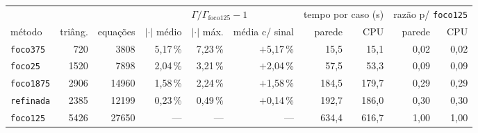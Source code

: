 \begin{tabular}{@{}lrrrrrrrrr@{}}
\toprule
 & & & \multicolumn{3}{c}{$\Gamma/\Gamma_{\mathrm{foco125}}-1$} & \multicolumn{2}{c}{tempo por caso (s)} & \multicolumn{2}{c}{razão p/ \texttt{foco125}} \\
\cmidrule(lr){4-6}\cmidrule(lr){7-8}\cmidrule(l){9-10}
método & triâng. & equações & $|\cdot|$ médio & $|\cdot|$ máx. & média c/ sinal & parede & CPU & parede & CPU \\
\midrule
\texttt{foco375} & 720 & 3808 & 5{,}17\,\% & 7{,}23\,\% & $+$5{,}17\,\% & 15{,}5 & 15{,}1 & 0{,}02 & 0{,}02 \\
\texttt{foco25} & 1520 & 7898 & 2{,}04\,\% & 3{,}21\,\% & $+$2{,}04\,\% & 57{,}5 & 53{,}3 & 0{,}09 & 0{,}09 \\
\texttt{foco1875} & 2906 & 14960 & 1{,}58\,\% & 2{,}24\,\% & $+$1{,}58\,\% & 184{,}5 & 179{,}7 & 0{,}29 & 0{,}29 \\
\texttt{refinada} & 2385 & 12199 & 0{,}23\,\% & 0{,}49\,\% & $+$0{,}14\,\% & 192{,}7 & 186{,}0 & 0{,}30 & 0{,}30 \\
\texttt{foco125} & 5426 & 27650 & --- & --- & --- & 634{,}4 & 616{,}7 & 1{,}00 & 1{,}00 \\
\bottomrule
\end{tabular}
